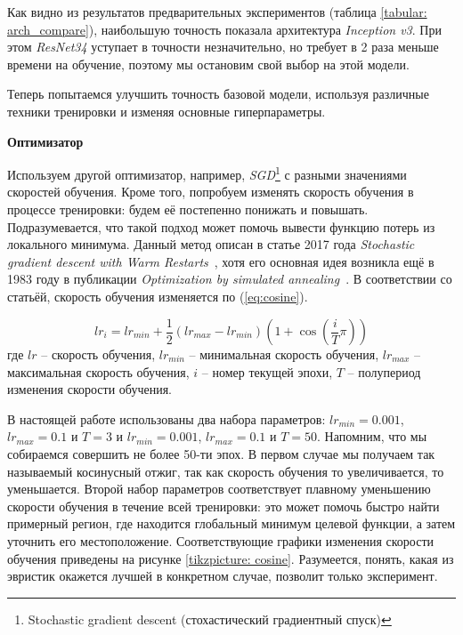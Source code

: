 \indent
\indent
Как видно из результатов предварительных экспериментов
(таблица \ref{tabular: arch_compare}), наибольшую
точность показала архитектура \textit{Inception v3}. При этом 
\textit{ResNet34} уступает в точности незначительно, но требует
в 2 раза меньше времени на обучение, поэтому мы остановим свой
выбор на этой модели. 


Теперь попытаемся улучшить точность базовой модели,
используя различные техники тренировки и изменяя основные гиперпараметры.

\vspace{0.5cm}
\indent
\indent
\textbf{Оптимизатор}

\indent
Используем другой оптимизатор, например,
\textit{SGD}\footnote{Stochastic gradient descent (стохастический 
градиентный спуск)} с 
разными значениями скоростей обучения.
Кроме того, попробуем изменять скорость обучения в процессе тренировки:
будем её постепенно понижать и повышать.
Подразумевается, что такой подход может
помочь вывести функцию потерь из локального минимума. Данный
метод описан в статье 2017 года
\textit{Stochastic gradient descent with Warm Restarts}~\cite{cosine},
хотя его основная идея возникла ещё в 1983 году в публикации
\textit{Optimization by simulated annealing}~\cite{annealing}. В соответствии со
статьёй, скорость обучения изменяется по (\ref{eq:cosine}).

\begin{equation}\label{eq:cosine}
    lr_i = lr_{min} + \frac{1}{2} (lr_{max} - lr_{min}) (1 + \cos(\frac{i}{T} \pi ))
\end{equation}
где $lr$ -- скорость обучения,
$lr_{min}$ -- минимальная скорость обучения,
$lr_{max}$ -- максимальная скорость обучения,
$i$ -- номер текущей эпохи,
$T$ -- полупериод изменения скорости обучения. 

\indent
В настоящей работе использованы два набора параметров:
$lr_{min} = 0.001$, $lr_{max} = 0.1$ и $T = 3$ и
$lr_{min} = 0.001$, $lr_{max} = 0.1$ и $T = 50$. 
Напомним, что мы собираемся совершить не более 50-ти эпох.
В первом случае мы получаем так называемый косинусный отжиг,
так как скорость обучения то увеличивается, то уменьшается.
Второй набор параметров соответствует плавному
уменьшению скорости обучения в течение всей тренировки:
это может помочь быстро найти примерный регион,
где находится глобальный
минимум целевой функции, а затем уточнить его местоположение.
Соответствующие графики изменения
скорости обучения приведены на рисунке \ref{tikzpicture: cosine}.
Разумеется, понять,
какая из эвристик окажется лучшей в конкретном случае, позволит
только эксперимент.


